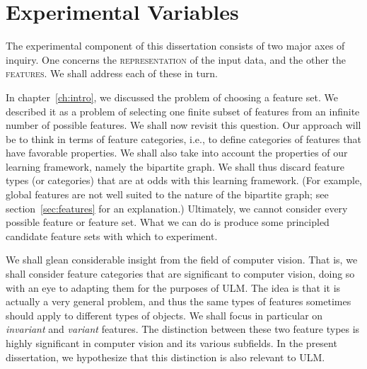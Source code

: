 \section{Experimental Variables}\label{sec:expvars}
The experimental component of this dissertation consists of two major axes of inquiry. 
One concerns the \textsc{representation} of the input data, and the other the \textsc{features}. 
We shall address each of these in turn. 

In chapter~\ref{ch:intro}, we discussed the problem of choosing a feature set. 
We described it as a problem of selecting one finite subset of 
features from an infinite number of possible features.
We shall now revisit this question. Our approach 
will be to think in terms of feature categories, i.e., to define categories of 
features that have favorable properties. We shall also take into account 
the properties of our learning framework, namely the bipartite graph. We shall thus discard feature types 
(or categories) that are at odds with this learning framework. (For example, global features are not well suited to
the nature of the bipartite graph; see section~\ref{sec:features} for an explanation.)
Ultimately, we cannot consider every 
possible feature or feature set. What we can do is produce some 
principled candidate feature sets with which to experiment. 

We shall glean considerable insight from the field of computer vision. 
That is, we shall consider feature 
categories that are significant to computer vision, doing so with an 
eye to adapting them for the purposes of \ac{ULM}. The idea is that it
is actually a very general problem, and thus the same types of features 
sometimes should apply to different types of objects.
We shall focus in particular on \emph{invariant} and \emph{variant} 
features. The distinction between these two feature types is highly significant in
computer vision and its various subfields. In the present dissertation, 
we hypothesize that this distinction is also relevant to ULM. 

